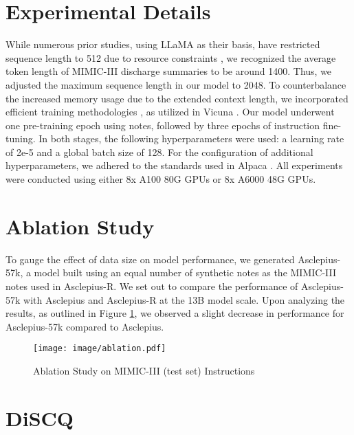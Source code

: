 \documentclass[11pt]{article}
\begin{document}
\newpage


\twocolumn


\section{Experimental Details}\label{Experimental Details}
While numerous prior studies, using LLaMA \cite{touvron2023llama} as their basis, have restricted sequence length to 512 due to resource constraints \citep{alpaca, han2023medalpaca, yunxiang2023chatdoctor}, we recognized the average token length of MIMIC-III discharge summaries \citep{johnson2016mimic} to be around 1400. 
Thus, we adjusted the maximum sequence length in our model to 2048. 
To counterbalance the increased memory usage due to the extended context length, we incorporated efficient training methodologies \citep{dao2022flashattention,chen2016training}, as utilized in Vicuna \citep{vicuna2023}. 
Our model underwent one pre-training epoch using notes, followed by three epochs of instruction fine-tuning. 
In both stages, the following hyperparameters were used: a learning rate of 2e-5 and a global batch size of 128. 
For the configuration of additional hyperparameters, we adhered to the standards used in Alpaca \citep{alpaca}. 
All experiments were conducted using either 8x A100 80G GPUs or 8x A6000 48G GPUs.

\section{Ablation Study}\label{ablation study}
To gauge the effect of data size on model performance, we generated Asclepius-57k, a model built using an equal number of synthetic notes as the MIMIC-III notes used in Asclepius-R. 
We set out to compare the performance of Asclepius-57k with Asclepius and Asclepius-R at the 13B model scale. 
Upon analyzing the results, as outlined in Figure \ref{fig:ablation}, we observed a slight decrease in performance for Asclepius-57k compared to Asclepius.

\begin{figure}[!htbp]
    \centering
    \texttt{[image: image/ablation.pdf]}
    \caption{Ablation Study on MIMIC-III (test set) Instructions}
    \label{fig:ablation}
\end{figure}


\vfill\eject

\section{DiSCQ} \label{apd:discq}
\end{document}
